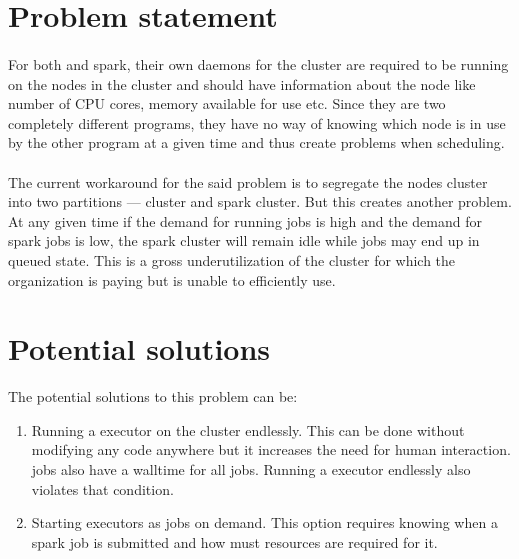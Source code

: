 
\section{Problem statement}

\paragraph{}
For both  and \gls{spark}, their own daemons for the cluster are
required to be running on the nodes in the cluster and should have information
about the node like number of CPU cores, memory available for use etc. Since
they are two completely different programs, they have no way of knowing which
node is in use by the other program at a given time and thus create problems
when scheduling.

\paragraph{}
The current workaround for the said problem is to segregate the nodes cluster
into two partitions ---  cluster and \gls{spark} cluster. But
this creates another problem. At any given time if the demand for running
 jobs is high and the demand for \gls{spark} jobs is low, the
\gls{spark} cluster will remain idle while  jobs may end up in
queued state. This is a gross underutilization of the cluster for which the
organization is paying but is unable to efficiently use.


\section{Potential solutions}

The potential solutions to this problem can be:
\begin{enumerate}
    \item Running a \gls{executor} on the  cluster
        endlessly. This can be done without modifying any code anywhere but it
        increases the need for human interaction.  jobs also
        have a \gls{walltime} for all jobs. Running a \gls{executor}
        endlessly also violates that condition.
    \item Starting \glspl{executor} as  jobs on demand.
        This option requires knowing when a \gls{spark} job is submitted and how
        must resources are required for it.
\end{enumerate}


